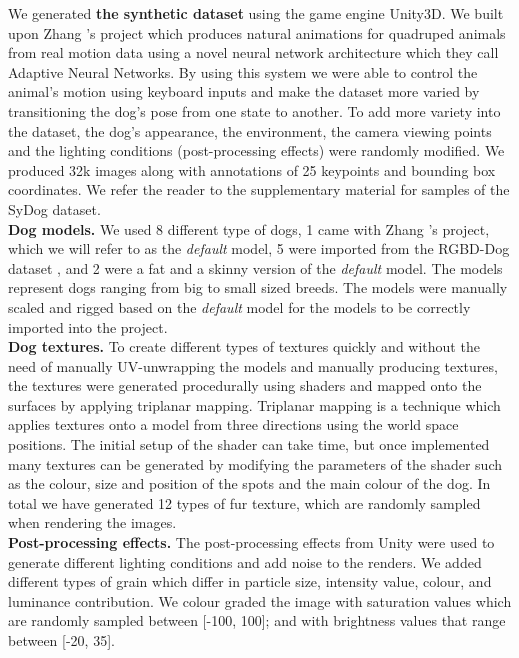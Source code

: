 \documentclass[final]{cvpr}
\begin{document}
We generated \textbf{the synthetic dataset} using the game engine Unity3D. We built upon Zhang \etal's project \cite{10.1145/3197517.3201366} which produces natural animations for quadruped animals from real motion data using a novel neural network architecture which they call Adaptive Neural Networks. By using this system we were able to control the animal's motion using keyboard inputs and make the dataset more varied by transitioning the dog's pose from one state to another. To add more variety into the dataset, the dog’s appearance, the environment, the camera viewing points and the lighting conditions (post-processing effects) were randomly modified. We produced 32k images along with annotations of 25 keypoints and bounding box coordinates. We refer the reader to the supplementary material for samples of the SyDog dataset.
\\\textbf{Dog models.} We used 8 different type of dogs, 1 came with Zhang \etal's project, which we will refer to as the \textit{default} model, 5 were imported from the RGBD-Dog dataset \cite{Kearney_2020_CVPR}, and 2 were a fat and a skinny version of the \textit{default} model. The models represent dogs ranging from big to small sized breeds. The models were manually scaled and rigged based on the \textit{default} model for the models to be correctly imported into the project.
\\\textbf{Dog textures.} To create different types of textures quickly and without the need of manually UV-unwrapping the models and manually producing textures, the textures were generated procedurally using shaders and mapped onto the surfaces by applying triplanar mapping. Triplanar mapping is a technique which applies textures onto a model from three directions using the world space positions. The initial setup of the shader can take time, but once implemented many textures can be generated by modifying the parameters of the shader such as the colour, size and position of the spots and the main colour of the dog. In total we have generated 12 types of fur texture, which are randomly sampled when rendering the images.
\\\textbf{Post-processing effects.} The post-processing effects from Unity were used to generate different lighting conditions and add noise to the renders. We added different types of grain which differ in particle size, intensity value, colour, and luminance contribution. We colour graded the image with saturation values which are randomly sampled between [-100, 100]; and with brightness values that range between [-20, 35]. \\
\end{document}
